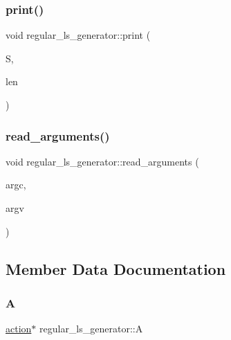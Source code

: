 \subsubsection{\texorpdfstring{print()}{print()}}
{\footnotesize\ttfamily void regular\+\_\+ls\+\_\+generator\+::print (\begin{DoxyParamCaption}\item[{\mbox{\hyperlink{galois_8h_a09fddde158a3a20bd2dcadb609de11dc}{I\+NT}} $\ast$}]{S,  }\item[{\mbox{\hyperlink{galois_8h_a09fddde158a3a20bd2dcadb609de11dc}{I\+NT}}}]{len }\end{DoxyParamCaption})}

\mbox{\label{classregular__ls__generator_a34ea8e77554ca5fdde71d28e1d78a4e5}} 
\subsubsection{\texorpdfstring{read\+\_\+arguments()}{read\_arguments()}}
{\footnotesize\ttfamily void regular\+\_\+ls\+\_\+generator\+::read\+\_\+arguments (\begin{DoxyParamCaption}\item[{int}]{argc,  }\item[{const char $\ast$$\ast$}]{argv }\end{DoxyParamCaption})}



\subsection{Member Data Documentation}
\mbox{\label{classregular__ls__generator_a10a7ab35cdbe6ac99666fadf6f1b82e9}} 
\subsubsection{\texorpdfstring{A}{A}}
{\footnotesize\ttfamily \mbox{\hyperlink{classaction}{action}}$\ast$ regular\+\_\+ls\+\_\+generator\+::A}

